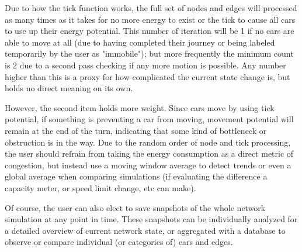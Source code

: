 \noindent Due to how the tick function works, the full set of nodes and edges will processed as many times as it takes for no more energy to exist or the tick to cause all cars to use up their energy potential. This number of iteration will be 1 if no cars are able to move at all (due to having completed their journey or being labeled temporarily by the user as "immobile"); but more frequently the minimum count is 2 due to a second pass checking if any more motion is possible.  Any number higher than this is a proxy for how complicated the current state change is, but holds no direct meaning on its own. \\

\par However, the second item holds more weight.  Since cars move by using tick potential, if something is preventing a car from moving, movement potential will remain at the end of the turn, indicating that some kind of bottleneck or obstruction is in the way.  Due to the random order of node and tick processing, the user should refrain from taking the energy consumption as a direct metric of congestion, but instead use a moving window average to detect trends or even a global average when comparing simulations (if evaluating the difference a capacity meter, or speed limit change, etc can make). \\

\par  Of course, the user can also elect to save snapshots of the whole network simulation at any point in time.  These snapshots can be individually analyzed for a detailed overview of current network state, or aggregated with a database to observe or compare individual (or categories of) cars and edges.

